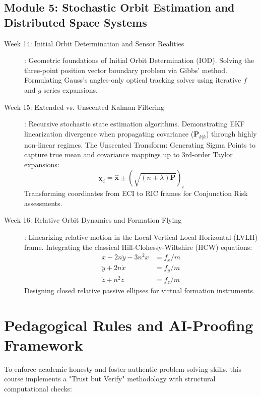 \documentclass[11pt, letterpaper]{article}
\begin{document}
\subsection*{Module 5: Stochastic Orbit Estimation and Distributed Space Systems}
\begin{description}
    \item[Week 14: Initial Orbit Determination and Sensor Realities]: Geometric foundations of Initial Orbit Determination (IOD). Solving the three-point position vector boundary problem via Gibbs' method. Formulating Gauss's angles-only optical tracking solver using iterative $f$ and $g$ series expansions.
    
    \item[Week 15: Extended vs. Unscented Kalman Filtering]: Recursive stochastic state estimation algorithms. Demonstrating EKF linearization divergence when propagating covariance ($\mathbf{P}_{k|k}$) through highly non-linear regimes. The Unscented Transform: Generating Sigma Points to capture true mean and covariance mappings up to 3rd-order Taylor expansions:
    \begin{equation}
        \boldsymbol{\chi}_i = \hat{\mathbf{x}} \pm \left( \sqrt{(n + \lambda)\mathbf{P}} \right)_i
    \end{equation}
    Transforming coordinates from ECI to RIC frames for Conjunction Risk assessments.
    
    \item[Week 16: Relative Orbit Dynamics and Formation Flying]: Linearizing relative motion in the Local-Vertical Local-Horizontal (LVLH) frame. Integrating the classical Hill-Clohessy-Wiltshire (HCW) equations:
    \begin{align}
        \ddot{x} - 2n\dot{y} - 3n^2x &= f_x / m \\
        \ddot{y} + 2n\dot{x} &= f_y / m \\
        \ddot{z} + n^2z &= f_z / m
    \end{align}
    Designing closed relative passive ellipses for virtual formation instruments.
\end{description}

\section{Pedagogical Rules and AI-Proofing Framework}
To enforce academic honesty and foster authentic problem-solving skills, this course implements a "Trust but Verify" methodology with structural computational checks:
\end{document}
